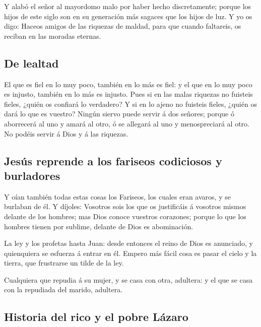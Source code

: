  Y alabó el señor al mayordomo malo por haber hecho
discretamente; porque los hijos de este siglo son en su generación más
sagaces que los hijos de luz.  Y yo os digo: Haceos amigos
de las riquezas de maldad, para que cuando faltareis, os reciban en las
moradas eternas.

\hypertarget{de-lealtad}{%
\subsection{De lealtad}\label{de-lealtad}}

 El que es fiel en lo muy poco, también en lo más es
fiel: y el que en lo muy poco es injusto, también en lo más es injusto.
 Pues si en las malas riquezas no fuisteis fieles, ¿quién
os confiará lo verdadero?  Y si en lo ajeno no fuisteis
fieles, ¿quién os dará lo que es vuestro?  Ningún siervo
puede servir á dos señores; porque ó aborrecerá al uno y amará al otro,
ó se allegará al uno y menospreciará al otro. No podéis servir á Dios y
á las riquezas.

\hypertarget{jesuxfas-reprende-a-los-fariseos-codiciosos-y-burladores}{%
\subsection{Jesús reprende a los fariseos codiciosos y
burladores}\label{jesuxfas-reprende-a-los-fariseos-codiciosos-y-burladores}}

 Y oían también todas estas cosas los Fariseos, los
cuales eran avaros, y se burlaban de él.  Y díjoles:
Vosotros sois los que os justificáis á vosotros mismos delante de los
hombres; mas Dios conoce vuestros corazones; porque lo que los hombres
tienen por sublime, delante de Dios es abominación.

 La ley y los profetas hasta Juan: desde entonces el
reino de Dios es anunciado, y quienquiera se esfuerza á entrar en él.
 Empero más fácil cosa es pasar el cielo y la tierra, que
frustrarse un tilde de la ley.

 Cualquiera que repudia á su mujer, y se casa con otra,
adultera: y el que se casa con la repudiada del marido, adultera.

\hypertarget{historia-del-rico-y-el-pobre-luxe1zaro}{%
\subsection{Historia del rico y el pobre
Lázaro}\label{historia-del-rico-y-el-pobre-luxe1zaro}}

